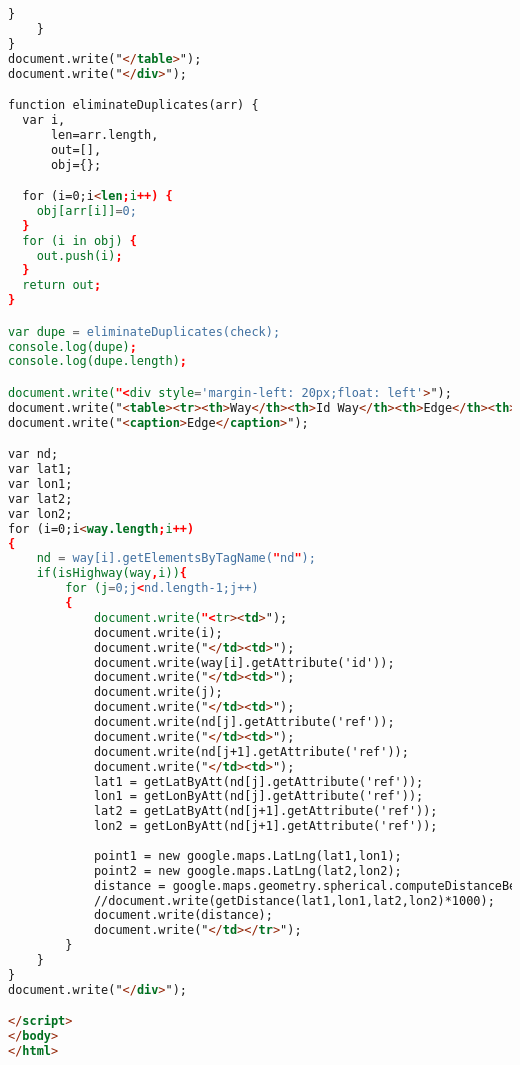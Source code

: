 \begin{lstlisting}[language=HTML,basicstyle=\tiny,caption=xml\_parsing.html]
		}
	}
}
document.write("</table>");
document.write("</div>");

function eliminateDuplicates(arr) {
  var i,
      len=arr.length,
      out=[],
      obj={};

  for (i=0;i<len;i++) {
    obj[arr[i]]=0;
  }
  for (i in obj) {
    out.push(i);
  }
  return out;
}

var dupe = eliminateDuplicates(check);
console.log(dupe);
console.log(dupe.length);

document.write("<div style='margin-left: 20px;float: left'>");
document.write("<table><tr><th>Way</th><th>Id Way</th><th>Edge</th><th>Id Node 1</th><th>Id Node 2</th><th>Jarak dalam meter</th></tr>");
document.write("<caption>Edge</caption>");

var nd;
var lat1;
var lon1;
var lat2;
var lon2;
for (i=0;i<way.length;i++)
{
	nd = way[i].getElementsByTagName("nd");
	if(isHighway(way,i)){
		for (j=0;j<nd.length-1;j++)
		{
			document.write("<tr><td>");
			document.write(i);
			document.write("</td><td>");
			document.write(way[i].getAttribute('id'));
			document.write("</td><td>");
			document.write(j);
			document.write("</td><td>");
			document.write(nd[j].getAttribute('ref'));
			document.write("</td><td>");
			document.write(nd[j+1].getAttribute('ref'));
			document.write("</td><td>");
			lat1 = getLatByAtt(nd[j].getAttribute('ref'));
			lon1 = getLonByAtt(nd[j].getAttribute('ref'));
			lat2 = getLatByAtt(nd[j+1].getAttribute('ref'));
			lon2 = getLonByAtt(nd[j+1].getAttribute('ref'));
			
			point1 = new google.maps.LatLng(lat1,lon1);
			point2 = new google.maps.LatLng(lat2,lon2);
			distance = google.maps.geometry.spherical.computeDistanceBetween(point1, point2);
			//document.write(getDistance(lat1,lon1,lat2,lon2)*1000);			
			document.write(distance);			
			document.write("</td></tr>");
		}
	}
}
document.write("</div>");

</script>
</body>
</html>
\end{lstlisting}